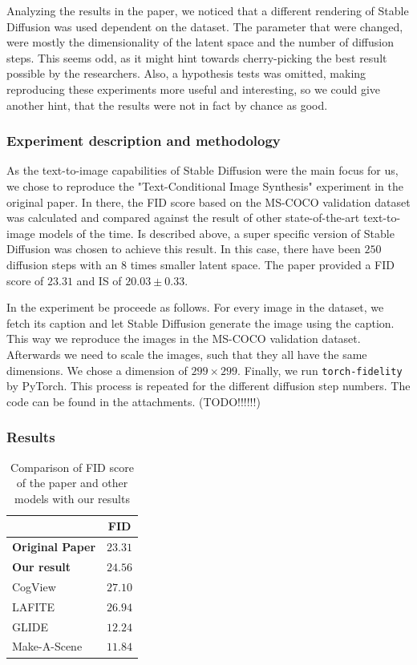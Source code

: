 \documentclass[11pt]{article}
\begin{document}
Analyzing the results in the paper, we noticed that a different rendering of Stable Diffusion was used dependent on the dataset. The parameter that were changed, were mostly the dimensionality of the latent space and the number of diffusion steps. This seems odd, as it might hint towards cherry-picking the best result possible by the researchers. Also, a hypothesis tests was omitted, making reproducing these experiments more useful and interesting, so we could give another hint, that the results were not in fact by chance as good.

\subsubsection{Experiment description and methodology}
As the text-to-image capabilities of Stable Diffusion were the main focus for us, we chose to reproduce the "Text-Conditional Image Synthesis" experiment in the original paper. In there, the FID score based on the MS-COCO validation dataset\cite{lin2015microsoftcococommonobjects} was calculated and compared against the result of other state-of-the-art text-to-image models of the time. Is described above, a super specific version of Stable Diffusion was chosen to achieve this result. In this case, there have been $250$ diffusion steps with an $8$ times smaller latent space. The paper provided a FID score of $23.31$ and IS of $20.03 \pm 0.33$.

In the experiment be proceede as follows. For every image in the dataset, we fetch its caption and let Stable Diffusion generate the image using the caption. This way we reproduce the images in the MS-COCO validation dataset. Afterwards we need to scale the images, such that they all have the same dimensions. We chose a dimension of $299\times299$. Finally, we run \texttt{torch-fidelity}\cite{obukhov2020torchfidelity} by PyTorch. This process is repeated for the different diffusion step numbers. The code can be found in the attachments. (TODO!!!!!!)

\subsubsection{Results}
\begin{table}
    \centering
    \begin{tabular}{l|c}
        & \textbf{FID} \\
        \hline
        \textbf{Original Paper} & $23.31$  \\
        \textbf{Our result} & $24.56$  \\
		\hline
		CogView \cite{ding2021cogviewmasteringtexttoimagegeneration} & $27.10$  \\
		LAFITE \cite{zhou2022lafitelanguagefreetrainingtexttoimage} & $26.94$  \\
		GLIDE \cite{rezende2014stochasticbackpropagationapproximateinference} & $12.24$  \\
		Make-A-Scene \cite{gafni2022makeascenescenebasedtexttoimagegeneration} & $11.84$ 
    \end{tabular}
    \caption{Comparison of FID score of the paper and other models with our results}
    \label{tab:fid_is_comparison}
\end{table}
\end{document}
